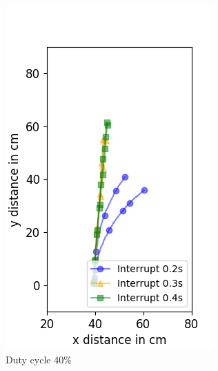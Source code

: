 \begin{figure}
	\begin{subfigure}[b]{0.32\textwidth}
		\includegraphics[width=\textwidth]{pics/figure_40.png}
		\caption{Duty cycle 40\%}
		\label{fig:target_40}
	\end{subfigure}
	\begin{subfigure}[b]{0.32\textwidth}

\end{subfigure}
\end{figure}

